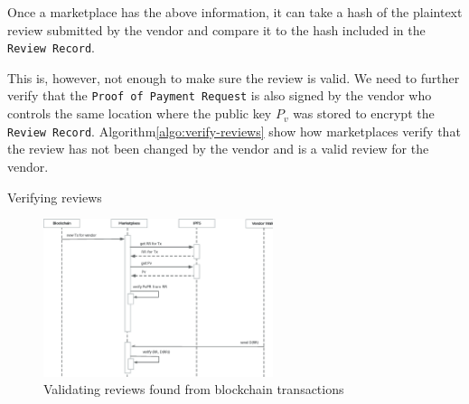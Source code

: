 \documentclass[a4paper]{article}
\begin{document}
Once a marketplace has the above information, it can take a hash of
the plaintext review submitted by the vendor and compare it to the
hash included in the \texttt{Review Record}.

This is, however, not enough to make sure the review is valid. We need
to further verify that the \texttt{Proof of Payment Request} is also
signed by the vendor who controls the same location where the public
key $P_v$ was stored to encrypt the \texttt{Review
  Record}. Algorithm\ref{algo:verify-reviews} show how marketplaces
verify that the review has not been changed by the vendor and is a
valid review for the vendor.

\begin{algorithm}
  \caption{Verifying reviews}\label{algo:verify-reviews}
  \begin{algorithmic}
  \end{algorithmic}    
\end{algorithm}

\begin{figure}
\centering
\includegraphics[width=0.6\textwidth]{../validating-new-tx.eps}
\caption{\label{fig:validating-new-tx}Validating reviews found from blockchain transactions}
\end{figure}
\end{document}
